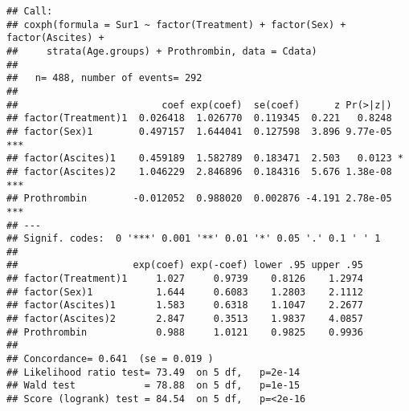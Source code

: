 \documentclass[
]{article}
\newenvironment{Shaded}{\begin{snugshade}}{\end{snugshade}}
\newcommand{\CommentTok}[1]{\textcolor[rgb]{0.56,0.35,0.01}{\textit{#1}}}
\newcommand{\DataTypeTok}[1]{\textcolor[rgb]{0.13,0.29,0.53}{#1}}
\newcommand{\FloatTok}[1]{\textcolor[rgb]{0.00,0.00,0.81}{#1}}
\newcommand{\KeywordTok}[1]{\textcolor[rgb]{0.13,0.29,0.53}{\textbf{#1}}}
\newcommand{\NormalTok}[1]{#1}
\newcommand{\OperatorTok}[1]{\textcolor[rgb]{0.81,0.36,0.00}{\textbf{#1}}}
\newcommand{\OtherTok}[1]{\textcolor[rgb]{0.56,0.35,0.01}{#1}}
\newcommand{\StringTok}[1]{\textcolor[rgb]{0.31,0.60,0.02}{#1}}
\begin{document}
\begin{Shaded}
\end{Shaded}

\begin{verbatim}
## Call:
## coxph(formula = Sur1 ~ factor(Treatment) + factor(Sex) + factor(Ascites) + 
##     strata(Age.groups) + Prothrombin, data = Cdata)
## 
##   n= 488, number of events= 292 
## 
##                         coef exp(coef)  se(coef)      z Pr(>|z|)    
## factor(Treatment)1  0.026418  1.026770  0.119345  0.221   0.8248    
## factor(Sex)1        0.497157  1.644041  0.127598  3.896 9.77e-05 ***
## factor(Ascites)1    0.459189  1.582789  0.183471  2.503   0.0123 *  
## factor(Ascites)2    1.046229  2.846896  0.184316  5.676 1.38e-08 ***
## Prothrombin        -0.012052  0.988020  0.002876 -4.191 2.78e-05 ***
## ---
## Signif. codes:  0 '***' 0.001 '**' 0.01 '*' 0.05 '.' 0.1 ' ' 1
## 
##                    exp(coef) exp(-coef) lower .95 upper .95
## factor(Treatment)1     1.027     0.9739    0.8126    1.2974
## factor(Sex)1           1.644     0.6083    1.2803    2.1112
## factor(Ascites)1       1.583     0.6318    1.1047    2.2677
## factor(Ascites)2       2.847     0.3513    1.9837    4.0857
## Prothrombin            0.988     1.0121    0.9825    0.9936
## 
## Concordance= 0.641  (se = 0.019 )
## Likelihood ratio test= 73.49  on 5 df,   p=2e-14
## Wald test            = 78.88  on 5 df,   p=1e-15
## Score (logrank) test = 84.54  on 5 df,   p=<2e-16
\end{verbatim}
\end{document}
